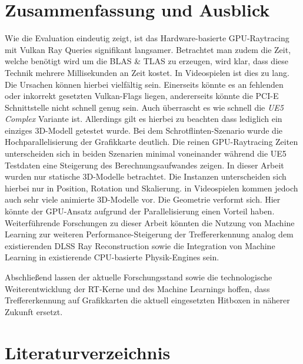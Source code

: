 \documentclass[11pt]{scrartcl}
\begin{document}
	\section{Zusammenfassung und Ausblick}
	Wie die Evaluation eindeutig zeigt, ist das Hardware-basierte GPU-Raytracing mit Vulkan Ray Queries signifikant langsamer. Betrachtet man zudem die Zeit, welche benötigt wird um die BLAS \& TLAS zu erzeugen, wird klar, dass diese Technik mehrere Millisekunden an Zeit kostet. In Videospielen ist dies zu lang. Die Ursachen können hierbei vielfältig sein. Einerseits könnte es an fehlenden oder inkorrekt gesetzten Vulkan-Flags liegen, andererseits könnte die PCI-E Schnittstelle nicht schnell genug sein. Auch überrascht es wie schnell die \textit{UE5 Complex} Variante ist. Allerdings gilt es hierbei zu beachten dass lediglich ein einziges 3D-Modell getestet wurde. Bei dem Schrotflinten-Szenario wurde die Hochparallelisierung der Grafikkarte deutlich. Die reinen GPU-Raytracing Zeiten unterscheiden sich in beiden Szenarien minimal voneinander während die UE5 Testdaten eine Steigerung des Berechnungsaufwandes zeigen. In dieser Arbeit wurden nur statische 3D-Modelle betrachtet. Die Instanzen unterscheiden sich hierbei nur in Position, Rotation und Skalierung. in Videospielen kommen jedoch auch sehr viele animierte 3D-Modelle vor. Die Geometrie verformt sich. Hier könnte der GPU-Ansatz aufgrund der Parallelisierung einen Vorteil haben. Weiterführende Forschungen zu dieser Arbeit könnten die Nutzung von Machine Learning zur weiteren Performance-Steigerung der Treffererkennung analog dem existierenden DLSS Ray Reconstruction sowie die Integration von Machine Learning in existierende CPU-basierte Physik-Engines sein.
	
	 Abschließend lassen der aktuelle Forschungsstand sowie die technologische Weiterentwicklung der RT-Kerne und des Machine Learnings hoffen, dass Treffererkennung auf Grafikkarten die aktuell eingesetzten Hitboxen in näherer Zukunft ersetzt.


	\pagebreak
	\section{Literaturverzeichnis}
	
	
	\printbibliography[nottype=online, heading=subbibliography, title={Gedruckte Quellen}]
	\printbibliography[type=online, heading=subbibliography, title={Online-Quellen}]
	
\end{document}
